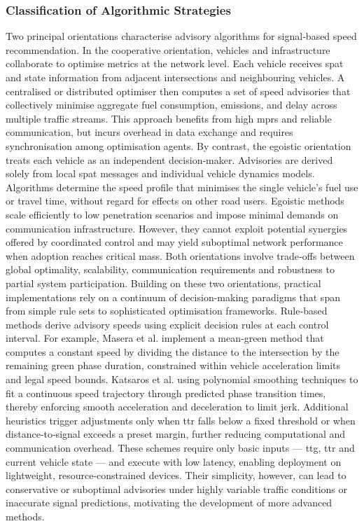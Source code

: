 \subsubsection{Classification of Algorithmic Strategies}
\label{subsubsec:classification_algorithms}

Two principal orientations characterise advisory algorithms for signal‐based speed recommendation. In the cooperative orientation, vehicles and infrastructure collaborate to optimise metrics at the network level. Each vehicle receives \ac{spat} and state information from adjacent intersections and neighbouring vehicles. A centralised or distributed optimiser then computes a set of speed advisories that collectively minimise aggregate fuel consumption, emissions, and delay across multiple traffic streams. This approach benefits from high \acp{mpr} and reliable communication, but incurs overhead in data exchange and requires synchronisation among optimisation agents.
By contrast, the egoistic orientation treats each vehicle as an independent decision‐maker. Advisories are derived solely from local \ac{spat} messages and individual vehicle dynamics models. Algorithms determine the speed profile that minimises the single vehicle’s fuel use or travel time, without regard for effects on other road users. Egoistic methods scale efficiently to low penetration scenarios and impose minimal demands on communication infrastructure. However, they cannot exploit potential synergies offered by coordinated control and may yield suboptimal network performance when adoption reaches critical mass.
Both orientations involve trade‐offs between global optimality, scalability, communication requirements and robustness to partial system participation.  
\mynewline
Building on these two orientations, practical implementations rely on a continuum of decision-making paradigms that span from simple rule sets to sophisticated optimisation frameworks. Rule‐based methods derive advisory speeds using explicit decision rules at each control interval. For example, Masera et al. \cite{Masera2019} implement a mean‐green method that computes a constant speed by dividing the distance to the intersection by the remaining green phase duration, constrained within vehicle acceleration limits and legal speed bounds. Katsaros et al. \cite{Katsaros2011} using polynomial smoothing techniques to fit a continuous speed trajectory through predicted phase transition times, thereby enforcing smooth acceleration and deceleration to limit jerk. Additional heuristics trigger adjustments only when \ac{ttr} falls below a fixed threshold or when distance‐to‐signal exceeds a preset margin, further reducing computational and communication overhead. These schemes require only basic inputs --- \ac{ttg}, \ac{ttr} and current vehicle state --- and execute with low latency, enabling deployment on lightweight, resource‐constrained devices. Their simplicity, however, can lead to conservative or suboptimal advisories under highly variable traffic conditions or inaccurate signal predictions, motivating the development of more advanced methods.
